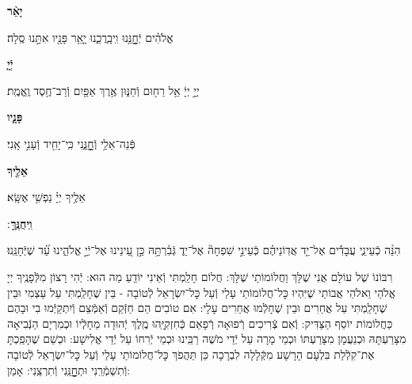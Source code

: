 \documentclass[twoside, openany, parskip=half, 11pt]{book}
\begin{document}
\textbf{יָאֵ֨ר}
\hfill \begin{footnotesize}
אֱלֹהִ֗ים יְֿחׇׇׇׇָנֵּ֥נוּ וִֽיבָֽרֲכֵ֑נוּ יָ֤אֵ֥ר פָּנָ֖יו אִתָּ֣נוּ סֶֽלָה׃\\
\end{footnotesize}
\textbf{יְֿיָ֧}
\hfill \begin{footnotesize}
יְיָ֣ יְיָ֔ אֵ֥ל רַח֖וּם וְֿחַנּ֑וּן אֶ֥רֶךְ אַפַּ֖יִם וְֿרַב־חֶ֥סֶד וֶֽאֱמֶֽת׃\\
\end{footnotesize}
\textbf{פָּנָ֛יו}
\hfill \begin{footnotesize}
פְּֿנֵה־אֵלַ֥י וְֿחׇׇׇׇׇָנֵּ֑נִי כִּֽי־יָחִ֖יד וְֿעָנִ֣י אָֽנִי׃\\
\end{footnotesize}
\textbf{אֵלֶ֖יךָ}
\hfill \begin{footnotesize}
אֵלֶ֥יךָ יְיָ֗ נַפְשִׁ֥י אֶשָּֽׂא׃\\
\end{footnotesize}
\textbf{וִֽיחֻנֶּֽךָּ}
׃ \hfill \begin{footnotesize}
הִנֵּ֨ה כְֿעֵינֵ֢י עֲבָדִ֡ים אֶל־יַ֤ד אֲדֽוֹנֵיהֶ֗ם כְּֿעֵינֵ֣י שִׁפְחָה֘ אֶל־יַד֢ גְּֿבִ֫רְתָּ֥הּ כֵּ֣ן עֵ֭ינֵינוּ אֶל־יְֿיָ֣ אֱלֹהֵ֑ינוּ עַ֝֗ד שֶׁיְּֿחָנֵּֽנוּ׃
\end{footnotesize}


רִבּוֹנוֹ שֶׁל עוֹלָם אֲנִי שֶׁלָּךְ וַחֲלוֹמוֹתַי שֶׁלָּךְ: חֲלוֹם חָלַֽמְתִּי וְֿאֵינִי יוֹדֵֽעַ מַה הוּא: יְֿהִי רָצוֹן מִלְּֿפָנֶֽיךָ יְיָ אֱלֹהַי וֵאלֹהֵי אֲבוֹתַי שֶׁיִּהְיוּ כׇּל־חֲלוֹמוֹתַי עָלַי וְֿעַל כׇּל־יִשְׂרָאֵל לְֿטוֹבָה - בֵּין שֶׁחָלַֽמְתִּי עַל עַצְמִי וּבֵין שֶׁחָלַֽמְתִּי עַל אֲחֵרִים וּבֵין שֶׁחָלְֿמוּ אֲחֵרִים עָלָי: אִם טוֹבִים הֵם חַזְּֿקֵם וְֿאַמְּֿצֵם וְֿיִתְקַיְּֿמוּ בִי וּבָהֶם כַּחֲלוֹמוֹת יוֹסֵף הַצַּדִּיק: וְֿאִם צְֿרִיכִים רְֿפוּאָה רְֿפָאֵם כְּֿחִזְקִיָּֽהוּ מֶֽלֶךְ יְֿהוּדָה מֵחָלְֿיוֹ וּכְמִרְיָם הַנְּֿבִיאָה מִצָּרַעְתָּהּ וּכְנַעֲמָן מִצָּרַעְתּוֹ וּכְמֵי מָרָה עַל יְֿדֵי מֹשֶׁה רַבֵּֽינוּ וּכְמֵי יְֿרִחוֹ עַל יְֿדֵי אֱלִישָׁע: וּכְשֵׁם שֶׁהָפַֽכְתָּ אֶת־קִלְֿלַת בִּלְעָם הָרָשָׁע מִקְּֿלָלָה לִבְרָכָה כֵּן תַּהֲפֹךְ כׇּל־חֲלוֹמוֹתַי עָלַי וְֿעַל כׇּל־יִשְׂרָאֵל לְֿטוֹבָה וְֿתִשְׁמְֿרֵֽנִי וּתְחׇׇׇׇׇָנֵּֽנִי וְֿתִרְצֵֽנִי: אָמֵן:
\end{document}
